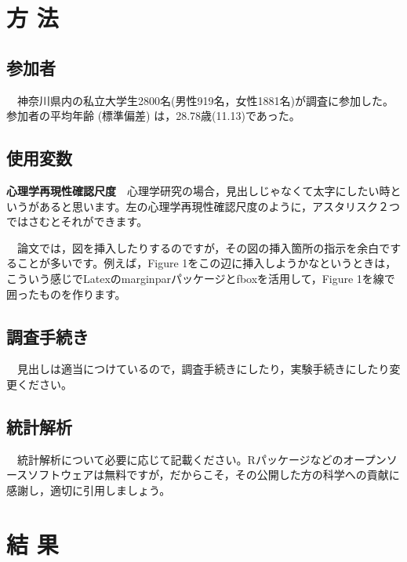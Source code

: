 \documentclass[11pt,a4paper,xelatex,ja=standard]{bxjsarticle}
\begin{document}
\hypertarget{ux65b9-ux6cd5}{%
\section{方 法}\label{ux65b9-ux6cd5}}

\hypertarget{ux53c2ux52a0ux8005}{%
\subsection{参加者}\label{ux53c2ux52a0ux8005}}

　神奈川県内の私立大学生2800名(男性919名，女性1881名)が調査に参加した。参加者の平均年齢
(標準偏差) は，28.78歳(11.13)であった。

\hypertarget{ux4f7fux7528ux5909ux6570}{%
\subsection{使用変数}\label{ux4f7fux7528ux5909ux6570}}

\textbf{心理学再現性確認尺度}　心理学研究の場合，見出しじゃなくて太字にしたい時というがあると思います。左の心理学再現性確認尺度のように，アスタリスク２つではさむとそれができます。

　論文では，図を挿入したりするのですが，その図の挿入箇所の指示を余白ですることが多いです。例えば，Figure
1をこの辺に挿入しようかなというときは，こういう感じでLatexのmarginparパッケージとfboxを活用して，Figure
1を線で囲ったものを作ります。

\hypertarget{ux8abfux67fbux624bux7d9aux304d}{%
\subsection{調査手続き}\label{ux8abfux67fbux624bux7d9aux304d}}

　見出しは適当につけているので，調査手続きにしたり，実験手続きにしたり変更ください。

\hypertarget{ux7d71ux8a08ux89e3ux6790}{%
\subsection{統計解析}\label{ux7d71ux8a08ux89e3ux6790}}

　統計解析について必要に応じて記載ください。Rパッケージなどのオープンソースソフトウェアは無料ですが，だからこそ，その公開した方の科学への貢献に感謝し，適切に引用しましょう。

\hypertarget{ux7d50-ux679c}{%
\section{結 果}\label{ux7d50-ux679c}}
\end{document}
